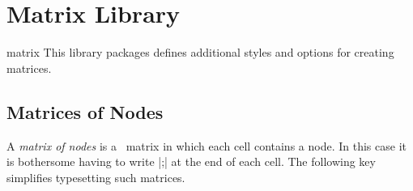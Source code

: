 %
%
%


\chapter{Matrix Library}

\begin{tikzlibrary}{matrix}
  This library packages defines additional styles and options for
  creating matrices.
\end{tikzlibrary}


\section{Matrices of Nodes}

A \emph{matrix of nodes} is a \tikzname\ matrix in which each cell
contains a node. In this case it is bothersome having to write
|;| at the end of each
cell. The following key simplifies typesetting such matrices.

